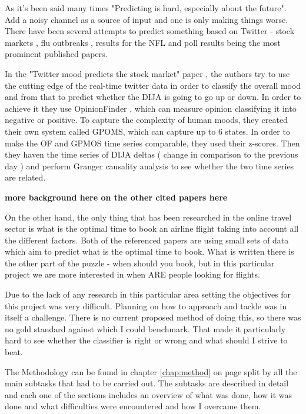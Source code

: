 \documentclass[minf,frontabs,twoside,singlespacing,parskip]{infthesis}
\begin{document}

As it's been said many times "Predicting is hard, especially about the future".  Add a noisy channel as a source of input and one is only making things worse. There have been several attempts to predict something based on Twitter - stock markets \cite{twitstock},  flu outbreaks \cite{twitflu}, results for the NFL \cite{twitnfl} and poll results \cite{twitpoll} being the most prominent published papers.

In the "Twitter mood predicts the stock market" paper \cite{twitstock}, the authors try to use the cutting edge of the real-time twitter data in order to classify the overall mood and from that to predict whether the DIJA \cite{dija} is going to go up or down. In order to achieve it they use OpinionFinder \cite{opfind}, which can measure opinion classifying it into negative or positive. To capture the complexity of human moods, they created their own system called GPOMS, which can capture up to 6 states. 
In order to make the OF and GPMOS time series comparable, they used their z-scores. Then they haven the time series of DIJA deltas ( change in comparison to the previous day ) and perform Granger causality analysis \cite{granger} to see whether the two time series are related.

\textbf{more background here on the other cited papers here}


On the other hand, the only thing that has been researched in the online travel sector is what is the optimal time to book an airline flight taking into account all the different factors. \cite{Hamletkdd03} \cite{ijcai} 
Both of the referenced papers are using small sets of data which aim to predict what is the optimal time to book. What is written there is the other part of the puzzle - when should you book, but in this particular project we are more interested in when ARE people looking for flights.


Due to the lack of any research in this particular area setting the objectives for this project was very difficult. Planning on how to approach and tackle was in itself a challenge. There is no current proposed method of doing this, so there was no gold standard against which I could benchmark. That made it particularly hard to see whether the classifier is right or wrong and what should I strive to beat.


The Methodology can be found in chapter \ref{chap:method} on page \pageref{chap:method} split by all the main subtasks that had to be carried out. The subtasks are described in detail and each one of the sections includes an overview of what was done, how it was done and what difficulties were encountered and how I overcame them. 
\end{document}
